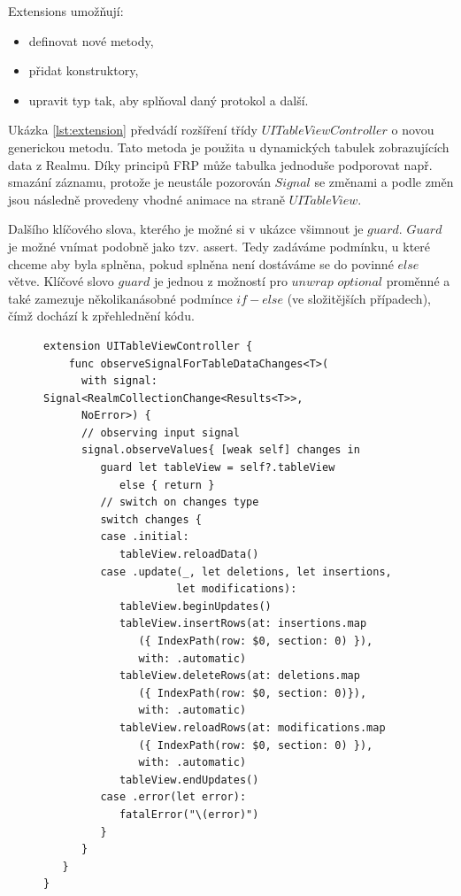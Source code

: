 \documentclass[thesis=M,czech]{FITthesis}[2012/06/26]
\begin{document}
Extensions umožňují: 
\begin{itemize}
	\item definovat nové metody,
	\item přidat konstruktory, 
	\item upravit typ tak, aby splňoval daný protokol a další. \cite{devExtensions}
\end{itemize}

Ukázka \ref{lst:extension} předvádí rozšíření třídy $UITableViewController$ o novou generickou metodu. Tato metoda je použita u dynamických tabulek zobrazujících data z Realmu. Díky principů FRP může tabulka jednoduše podporovat např. smazání záznamu, protože je neustále pozorován $Signal$ se změnami a podle změn jsou následně provedeny vhodné animace na straně $UITableView$.

Dalšího klíčového slova, kterého je možné si v ukázce všimnout je $guard$. $Guard$ je možné vnímat podobně jako tzv. assert. Tedy zadáváme podmínku, u které chceme aby byla splněna, pokud splněna není dostáváme se do povinné $else$ větve. Klíčové slovo $guard$ je jednou z možností pro $unwrap$ $optional$ proměnné a také zamezuje několikanásobné podmínce $if-else$ (ve složitějších případech), čímž dochází k zpřehlednění kódu. \cite{devGuard}

\begin{figure}
\begin{minipage}{\linewidth}
\begin{lstlisting}[caption={Ukázka Extension},label={lst:extension}]
extension UITableViewController {
    func observeSignalForTableDataChanges<T>(
      with signal: Signal<RealmCollectionChange<Results<T>>,
      NoError>) {
      // observing input signal
      signal.observeValues{ [weak self] changes in
         guard let tableView = self?.tableView
            else { return }
         // switch on changes type   
         switch changes {
         case .initial:
            tableView.reloadData()
         case .update(_, let deletions, let insertions,
                     let modifications):
            tableView.beginUpdates()
            tableView.insertRows(at: insertions.map
               ({ IndexPath(row: $0, section: 0) }),
               with: .automatic)
            tableView.deleteRows(at: deletions.map
               ({ IndexPath(row: $0, section: 0)}),
               with: .automatic)
            tableView.reloadRows(at: modifications.map
               ({ IndexPath(row: $0, section: 0) }),
               with: .automatic)
            tableView.endUpdates()
         case .error(let error):
            fatalError("\(error)")
         }
      }
   }
}
\end{lstlisting}
\end{minipage}
\end{figure}
	
\end{document}
